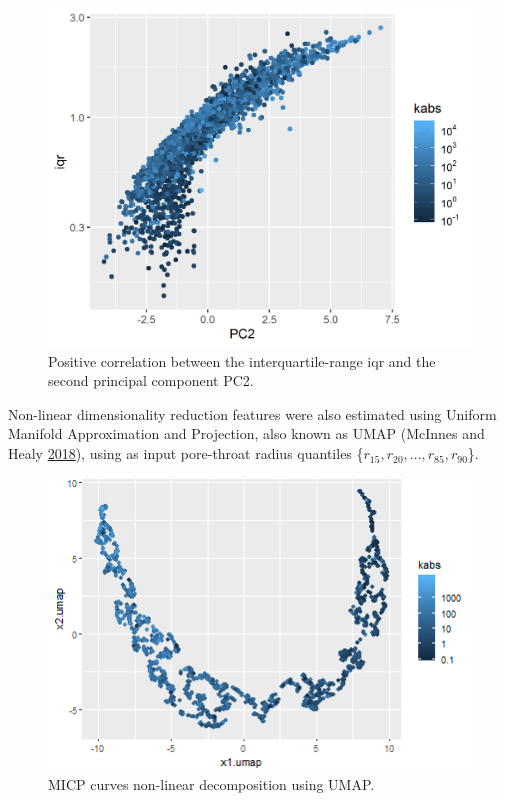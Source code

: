 \documentclass[english,msc,numbers]{coppe}
\begin{document}
  \begin{figure}
  
  {\centering \includegraphics[width=0.75\linewidth]{figure/3-6-pca-PC2-iqr} 
  
  }
  
  \caption{Positive correlation between the interquartile-range iqr and the second principal component PC2.}\label{fig:pca-PC2}
  \end{figure}
  \par
  
  Non-linear dimensionality reduction features were also estimated using Uniform Manifold Approximation and Projection, also known as UMAP (McInnes and Healy \protect\hyperlink{ref-McInnes2018}{2018}), using as input pore-throat radius quantiles \{\(r_{15},r_{20},...,r_{85},r_{90}\)\}.
  \begin{figure}
  
  {\centering \includegraphics[width=0.75\linewidth]{figure/3-7-umap} 
  
  }
  
  \caption{MICP curves non-linear decomposition using UMAP.}\label{fig:umap}
  \end{figure}
  \par
  
\end{document}
